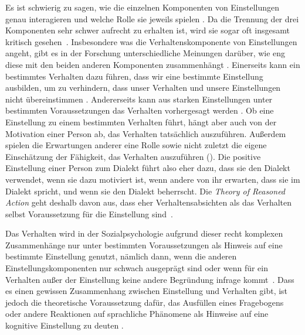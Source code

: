 Es ist schwierig zu sagen, wie die einzelnen Komponenten von Einstellungen genau interagieren und welche Rolle sie jeweils spielen \citep[s.][400]{Lasagabaster.2005}. 
Da die Trennung der drei Komponenten sehr schwer aufrecht zu erhalten ist, wird sie sogar oft insgesamt kritisch gesehen~\citep[s. etwa][34]{Cuonz.2014}. 
Insbesondere was die Verhaltenskomponente von Einstellungen angeht, gibt es in der Forschung unterschiedliche Meinungen dar{\"u}ber, wie eng diese mit den beiden anderen Komponenten zusammenh{\"a}ngt \citep[s.][25]{Garrett.2012}. 
Einerseits kann ein bestimmtes Verhalten dazu führen, dass wir eine bestimmte Einstellung ausbilden, um zu verhindern, dass unser Verhalten und unsere Einstellungen nicht übereinstimmen \citep[s.][203]{Jonas.2014}. 
Andererseits kann aus starken Einstellungen unter bestimmten Voraussetzungen das Verhalten vorhergesagt werden \citep[s.][224--225]{Jonas.2014}. 
Ob eine Einstellung zu einem bestimmten Verhalten führt, hängt aber auch von der Motivation einer Person ab, das Verhalten tatsächlich auszuführen. 
Außerdem spielen die Erwartungen anderer eine Rolle sowie nicht zuletzt die eigene Einschätzung der Fähigkeit, das Verhalten auszuführen (\cites[s.][224--225]{Jonas.2014}[s. auch][]{Ajzen.1977}). 
Die positive Einstellung einer Person zum Dialekt führt also eher dazu, dass sie den Dialekt verwendet, wenn sie dazu motiviert ist, wenn andere von ihr erwarten, dass sie im Dialekt spricht, und wenn sie den Dialekt beherrscht. 
Die \textit{Theory of Reasoned Action} geht deshalb davon aus, dass eher Verhaltensabsichten als das Verhalten selbst Voraussetzung für die Einstellung sind~\citep[s.][26--27]{Garrett.2012}.\largerpage[-1]

Das Verhalten wird in der Sozialpsychologie aufgrund dieser recht komplexen Zusammenhänge nur unter bestimmten Voraussetzungen als Hinweis auf eine bestimmte Einstellung genutzt, n{\"a}mlich dann, wenn die anderen Einstellungskomponenten nur schwach ausgepr{\"a}gt sind oder wenn f{\"u}r ein Verhalten au{\ss}er der Einstellung keine andere Begr{\"u}ndung infrage kommt~\citep[s.][221]{Aronson.2014}. 
Dass es einen gewissen Zusammenhang zwischen Einstellung und Verhalten gibt, ist jedoch die theoretische Voraussetzung dafür, das Ausfüllen eines Fragebogens oder andere Reaktionen auf sprachliche Phänomene als Hinweise auf eine kognitive Einstellung zu deuten \citep[s.][401]{Lasagabaster.2005}.

